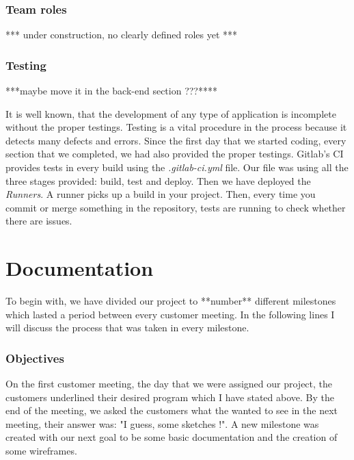 \documentclass{l3proj}
\begin{document}
\subsubsection{Team roles}
\label{roles}
*** under construction, no clearly defined roles yet ***
 
\subsubsection{Testing}
\label{testing}
***maybe move it in the back-end section ???****

It is well known, that the development of any type of application is incomplete without the proper testings. Testing is a vital procedure in the process because it detects many defects and errors. Since the first day that we started coding, every section that we completed, we had also provided the proper testings. Gitlab's CI provides tests in every build using the \textit{.gitlab-ci.yml} file. Our file was using all the three stages provided: build, test and deploy. Then we have deployed the \textit{Runners}. A runner picks up a build in your project. Then, every time you commit or merge something in the repository, tests are running to check whether there are issues.





\section{Documentation}
\label{documentation}

To begin with, we have divided our project to **number** different milestones which lasted a period between every customer meeting. In the following lines I will discuss the process that was taken in every milestone.

\subsubsection{Objectives}
\label{objectives} 

On the first customer meeting, the day that we were assigned our project, the customers underlined their desired program which I have stated above. By the end of the meeting, we asked the customers what the wanted to see in the next meeting, their answer was: "I guess, some sketches !". A new milestone was created with our next goal to be some basic documentation and the creation of some wireframes.
\end{document}
